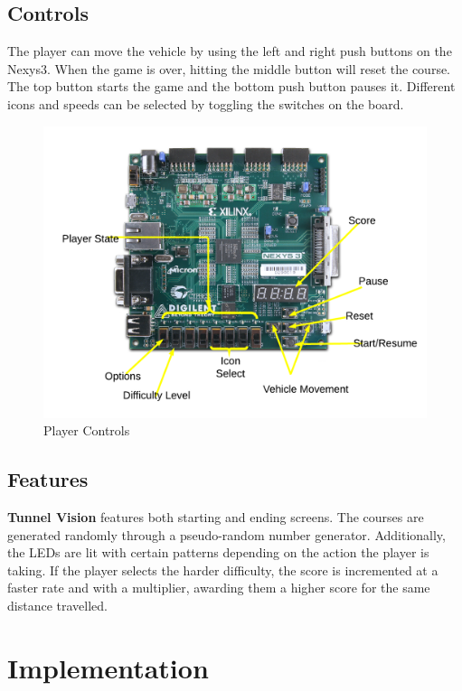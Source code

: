 \documentclass[11pt]{article}
\begin{document}
\subsection{Controls}
The player can move the vehicle by using the left and right push buttons on the Nexys3. When the game is over, hitting the middle button will reset the course. The top button starts the game and the bottom push button pauses it. Different icons and speeds can be selected by toggling the switches on the board.

		\begin{figure}[h]\centering
		\includegraphics[height=0.8\textwidth, width=0.8\textheight]{Images/controls_mockup.png}
		\caption{Player Controls}
			\label{controls}
		\end{figure}	
	 	

\subsection{Features}
\textbf{Tunnel Vision} features both starting and ending screens. The courses are generated randomly through a pseudo-random number generator. Additionally, the LEDs are lit with certain patterns depending on the action the player is taking. If the player selects the harder difficulty, the score is incremented at a faster rate and with a multiplier, awarding them a higher score for the same distance travelled.	

\section{Implementation}
\end{document}
